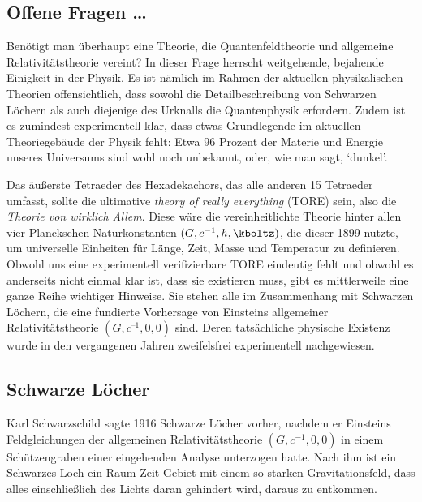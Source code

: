 \documentclass{scrartcl}
\begin{document}
\subsection*{Offene Fragen \dots}

Benötigt man überhaupt eine Theorie, die Quantenfeldtheorie und allgemeine Relativitätstheorie vereint? In dieser Frage herrscht weitgehende, bejahende Einigkeit in der Physik. Es ist nämlich im Rahmen der aktuellen physikalischen Theorien offensichtlich, dass sowohl die Detailbeschreibung von Schwarzen Löchern als auch diejenige des Urknalls die Quantenphysik erfordern. Zudem ist es zumindest experimentell klar, dass etwas Grundlegende im aktuellen Theoriegebäude der Physik fehlt: Etwa 96 Prozent der Materie und Energie unseres Universums sind wohl noch unbekannt, oder, wie man sagt, \enquote*{dunkel}.


\newpage {}
\label{sec:1111}

Das äußerste Tetraeder des Hexadekachors, das alle anderen 15 Tetraeder umfasst, sollte die ultimative 
\emph{theory of really everything} (TORE) sein, also die \emph{Theorie von wirklich Allem}.
Diese wäre die vereinheitlichte Theorie hinter allen vier Planckschen Naturkonstanten $(G,c^{-1},h,\kboltz)$, die dieser 1899 nutzte, um universelle Einheiten für Länge, Zeit, Masse und Temperatur zu definieren. Obwohl uns eine experimentell verifizierbare TORE eindeutig fehlt und obwohl es anderseits nicht einmal klar ist, dass sie existieren muss, gibt es mittlerweile eine ganze Reihe wichtiger Hinweise. Sie stehen alle im Zusammenhang mit Schwarzen Löchern, die eine fundierte Vorhersage von Einsteins allgemeiner Relativitätstheorie $(G, c^{–1}, 0, 0)$ sind. Deren tatsächliche physische Existenz wurde in den vergangenen Jahren zweifelsfrei experimentell nachgewiesen.


\subsection*{Schwarze Löcher}

Karl Schwarzschild sagte 1916 Schwarze Löcher vorher, nachdem er Einsteins Feldgleichungen der allgemeinen Relativitätstheorie $(G,c^{-1},0,0)$ in einem Schützengraben einer eingehenden Analyse unterzogen hatte. Nach ihm ist ein Schwarzes Loch ein Raum-Zeit-Gebiet mit einem so starken Gravitationsfeld, dass alles einschließlich des Lichts daran gehindert wird, daraus zu entkommen.
\end{document}
